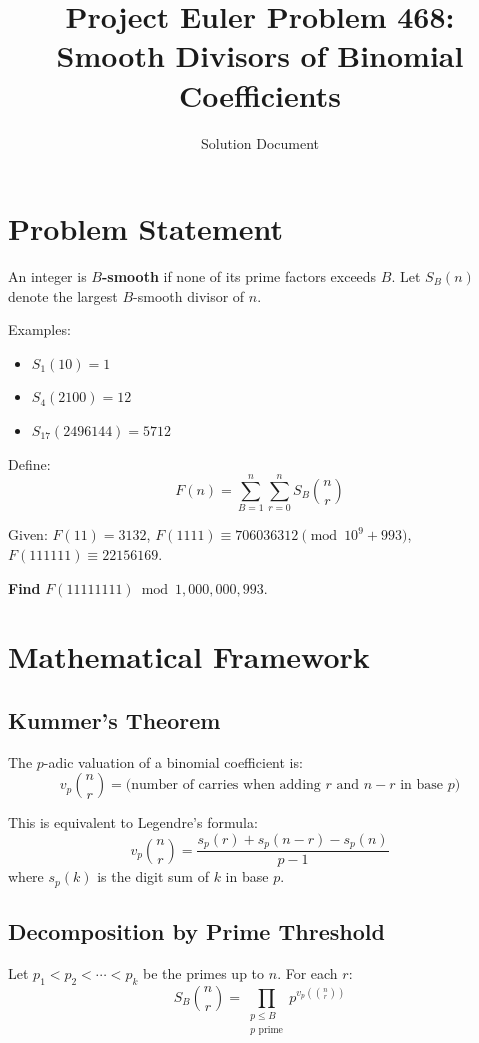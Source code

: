 \documentclass[11pt]{article}
\title{Project Euler Problem 468: Smooth Divisors of Binomial Coefficients}
\author{Solution Document}
\date{}
\begin{document}
\maketitle

\section{Problem Statement}

An integer is \textbf{$B$-smooth} if none of its prime factors exceeds $B$. Let $S_B(n)$ denote the largest $B$-smooth divisor of $n$.

Examples:
\begin{itemize}
\item $S_1(10) = 1$
\item $S_4(2100) = 12$
\item $S_{17}(2496144) = 5712$
\end{itemize}

Define:
\[
F(n) = \sum_{B=1}^{n} \sum_{r=0}^{n} S_B\binom{n}{r}
\]

Given: $F(11) = 3132$, $F(1111) \equiv 706036312 \pmod{10^9+993}$, $F(111111) \equiv 22156169$.

\textbf{Find} $F(11111111) \bmod 1{,}000{,}000{,}993$.

\section{Mathematical Framework}

\subsection{Kummer's Theorem}

The $p$-adic valuation of a binomial coefficient is:
\[
v_p\binom{n}{r} = \text{(number of carries when adding $r$ and $n-r$ in base $p$)}
\]

This is equivalent to Legendre's formula:
\[
v_p\binom{n}{r} = \frac{s_p(r) + s_p(n-r) - s_p(n)}{p-1}
\]
where $s_p(k)$ is the digit sum of $k$ in base $p$.

\subsection{Decomposition by Prime Threshold}

Let $p_1 < p_2 < \cdots < p_k$ be the primes up to $n$. For each $r$:
\[
S_B\binom{n}{r} = \prod_{\substack{p \leq B \\ p \text{ prime}}} p^{v_p(\binom{n}{r})}
\]
\end{document}
